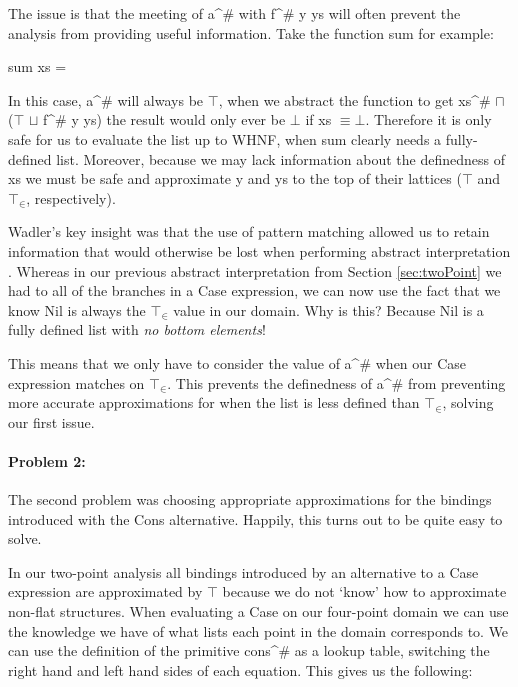 The issue is that the \<meet\>ing of \<a^{\#}\> with \<f^{\#} y ys\> will often
prevent the analysis from providing useful information. Take the function
\<sum\> for example:

\begin{haskell*}
sum xs = 
\end{haskell*}

In this case, \<a^{\#}\> will always be $\top$, when we abstract the function
to get \<xs^{\#} \(\sqcap\) (\(\top\) \(\sqcup\) f^{\#} y ys)\> the result
would only ever be $\bot$ if \<xs \(\equiv \bot\)\>. Therefore it is only safe
for us to evaluate the list up to WHNF, when \<sum\> clearly needs a
fully-defined list. Moreover, because we may lack information about
the definedness of \<xs\> we must be safe and approximate \<y\> and \<ys\> to
the top of their lattices ($\top$ and $\top_{\in}$, respectively). 

Wadler's key insight was that the use of pattern matching allowed us to retain
information that would otherwise be lost when performing abstract
interpretation \citep{wadler1987strictness}. Whereas in our previous abstract
interpretation from Section \ref{sec:twoPoint} we had to \join all of the
branches in a \<Case\> expression, we can now use the fact that we know \<Nil\>
is always the $\top_{\in}$ value in our domain.  Why is this?  Because \<Nil\>
is a fully defined list with \emph{no bottom elements}!

This means that we only have to consider the value of \<a^{\#}\> when our
\<Case\> expression matches on $\top_{\in}$. This prevents the definedness
of \<a^{\#}\> from preventing more accurate approximations for when the list is
less defined than $\top_{\in}$, solving our first issue.

\paragraph{Problem 2:} The second problem was choosing appropriate approximations
for the bindings introduced with the \<Cons\> alternative. Happily, this turns out
to be quite easy to solve.

In our two-point analysis all bindings introduced by an alternative to a
\<Case\> expression are approximated by $\top$ because we do not `know' how to
approximate non-flat structures. When evaluating a \<Case\> on our four-point
domain we can use the knowledge we have of what lists each point in the domain
corresponds to. We can use the definition of the primitive \<cons^{\#}\> as
a lookup table, switching the right hand and left hand sides of each equation.
This gives us the following:

